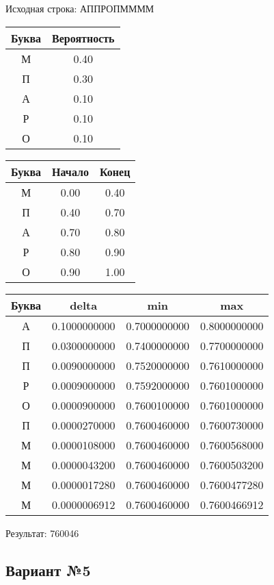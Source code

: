 \documentclass[a4paper, 12pt]{article}
\begin{document}
Исходная строка: АППРОПММММ\
\begin{center}
 \begin{tabular}{ |c|c| } 
  \hline
     Буква & Вероятность \\ \hline
М & 0.40\\\hline
П & 0.30\\\hline
А & 0.10\\\hline
Р & 0.10\\\hline
О & 0.10
\\ \hline \end{tabular}
\end{center}
\begin{center}
 \begin{tabular}{ |c|c|c| } 
  \hline
     Буква & Начало & Конец \\ \hline
М & 0.00 & 0.40\\\hline
П & 0.40 & 0.70\\\hline
А & 0.70 & 0.80\\\hline
Р & 0.80 & 0.90\\\hline
О & 0.90 & 1.00
\\ \hline \end{tabular}
\end{center}
\begin{center}
 \begin{tabular}{ |c|c|c|c| } 
  \hline
     Буква & delta & min & max \\ \hline
А & 0.1000000000 & 0.7000000000 & 0.8000000000\\\hline
П & 0.0300000000 & 0.7400000000 & 0.7700000000\\\hline
П & 0.0090000000 & 0.7520000000 & 0.7610000000\\\hline
Р & 0.0009000000 & 0.7592000000 & 0.7601000000\\\hline
О & 0.0000900000 & 0.7600100000 & 0.7601000000\\\hline
П & 0.0000270000 & 0.7600460000 & 0.7600730000\\\hline
М & 0.0000108000 & 0.7600460000 & 0.7600568000\\\hline
М & 0.0000043200 & 0.7600460000 & 0.7600503200\\\hline
М & 0.0000017280 & 0.7600460000 & 0.7600477280\\\hline
М & 0.0000006912 & 0.7600460000 & 0.7600466912
\\ \hline \end{tabular}
\end{center}
Результат: 760046
\pagebreak
\subsection{Вариант №5}
\end{document}
